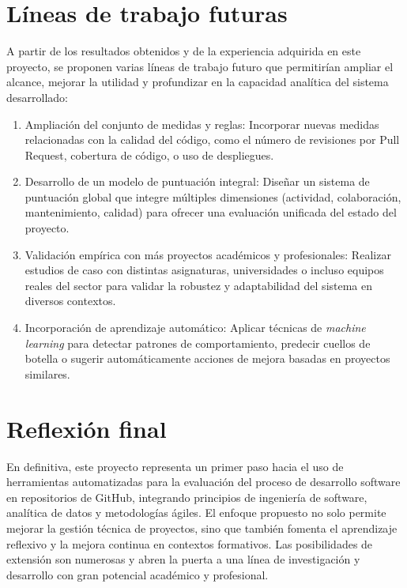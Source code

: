 \section*{Líneas de trabajo futuras}

A partir de los resultados obtenidos y de la experiencia adquirida en este proyecto, se proponen varias líneas de trabajo futuro que permitirían ampliar el alcance, mejorar la utilidad y profundizar en la capacidad analítica del sistema desarrollado:

\begin{enumerate}
\item Ampliación del conjunto de medidas y reglas: Incorporar nuevas medidas relacionadas con la calidad del código, como el número de revisiones por Pull Request, cobertura de código, o uso de despliegues.
\item Desarrollo de un modelo de puntuación integral: Diseñar un sistema de puntuación global que integre múltiples dimensiones (actividad, colaboración, mantenimiento, calidad) para ofrecer una evaluación unificada del estado del proyecto.
\item Validación empírica con más proyectos académicos y profesionales: Realizar estudios de caso con distintas asignaturas, universidades o incluso equipos reales del sector para validar la robustez y adaptabilidad del sistema en diversos contextos.
\item Incorporación de aprendizaje automático: Aplicar técnicas de \textit{machine learning} para detectar patrones de comportamiento, predecir cuellos de botella o sugerir automáticamente acciones de mejora basadas en proyectos similares.
\end{enumerate}

\section*{Reflexión final}

En definitiva, este proyecto representa un primer paso hacia el uso de herramientas automatizadas para la evaluación del proceso de desarrollo software en repositorios de GitHub, integrando principios de ingeniería de software, analítica de datos y metodologías ágiles. El enfoque propuesto no solo permite mejorar la gestión técnica de proyectos, sino que también fomenta el aprendizaje reflexivo y la mejora continua en contextos formativos. Las posibilidades de extensión son numerosas y abren la puerta a una línea de investigación y desarrollo con gran potencial académico y profesional.